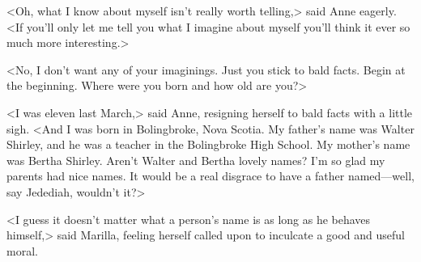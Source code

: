 <Oh, what I know about myself isn't really worth telling,> said Anne eagerly. <If you'll only let me tell you what I imagine about myself you'll think it ever so much more interesting.>

<No, I don't want any of your imaginings. Just you stick to bald facts. Begin at the beginning. Where were you born and how old are you?>

<I was eleven last March,> said Anne, resigning herself to bald facts with a little sigh. <And I was born in Bolingbroke, Nova Scotia. My father's name was Walter Shirley, and he was a teacher in the Bolingbroke High School. My mother's name was Bertha Shirley. Aren't Walter and Bertha lovely names? I'm so glad my parents had nice names. It would be a real disgrace to have a father named—well, say Jedediah, wouldn't it?>

<I guess it doesn't matter what a person's name is as long as he behaves himself,> said Marilla, feeling herself called upon to inculcate a good and useful moral.

